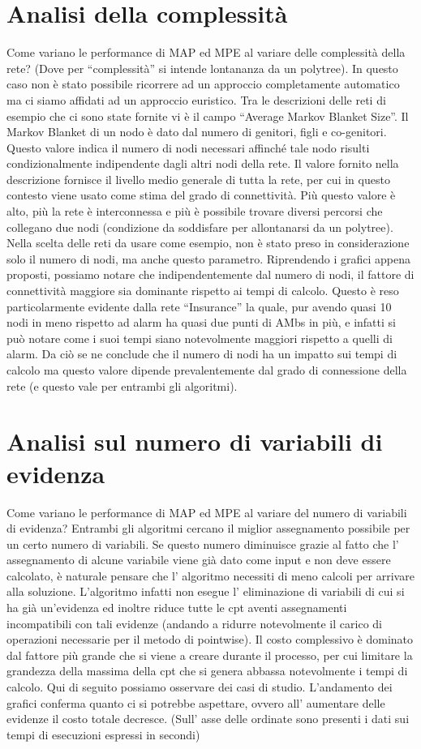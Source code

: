 \section{Analisi della complessità}
Come variano le performance di MAP ed MPE al variare delle complessità della rete? (Dove per “complessità” si intende lontananza da un polytree). In questo caso non è stato possibile ricorrere ad un approccio completamente automatico ma ci siamo affidati ad un approccio euristico. Tra le descrizioni delle reti di esempio che ci sono state fornite vi è il campo “Average Markov Blanket Size”. Il Markov Blanket di un nodo è dato dal numero di genitori, figli e co-genitori. Questo valore indica il numero di nodi necessari affinché tale nodo risulti condizionalmente indipendente dagli altri nodi della rete. Il valore fornito nella descrizione fornisce il livello medio generale di tutta la rete, per cui in questo contesto viene usato come stima del grado di connettività. Più questo valore è alto, più la rete è interconnessa e più è possibile trovare diversi percorsi che collegano due nodi (condizione da soddisfare per allontanarsi da un polytree). Nella scelta delle reti da usare come esempio, non è stato preso in considerazione solo il numero di nodi, ma anche questo parametro. Riprendendo i grafici appena proposti, possiamo notare che indipendentemente dal numero di nodi, il fattore di connettività maggiore sia dominante rispetto ai tempi di calcolo. Questo è reso particolarmente evidente dalla rete “Insurance” la quale, pur avendo quasi 10 nodi in meno rispetto ad alarm ha quasi due punti di AMbs in più, e infatti si può notare come i suoi tempi siano notevolmente maggiori rispetto a quelli di alarm. Da ciò se ne conclude che il numero di nodi ha un impatto sui tempi di calcolo ma questo valore dipende prevalentemente dal grado di connessione della rete (e questo vale per entrambi gli algoritmi).

\section{Analisi sul numero di variabili di evidenza}
Come variano le performance di MAP ed MPE al variare del numero di variabili di evidenza? Entrambi gli algoritmi cercano il miglior assegnamento possibile per un certo numero di variabili. Se questo numero diminuisce grazie al fatto che l’ assegnamento di alcune variabile viene già dato come input e non deve essere calcolato, è naturale pensare che l’ algoritmo necessiti di meno calcoli per arrivare alla soluzione.  L’algoritmo infatti non esegue l’ eliminazione di variabili di cui si ha già un’evidenza ed inoltre riduce tutte le cpt aventi assegnamenti incompatibili con tali evidenze (andando a ridurre notevolmente il carico di operazioni necessarie per il metodo di pointwise). Il costo complessivo è dominato dal fattore più grande che si viene a creare durante il processo, per cui limitare la grandezza della massima della cpt che si genera abbassa notevolmente i tempi di calcolo. Qui di seguito possiamo osservare dei casi di studio. 
L’andamento dei grafici conferma quanto ci si potrebbe aspettare, ovvero all’ aumentare delle evidenze il costo totale decresce.
(Sull' asse delle ordinate sono presenti i dati sui tempi di esecuzioni espressi in secondi)

